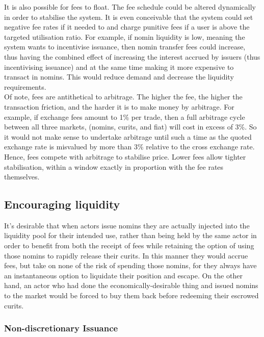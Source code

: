\noindent It is also possible for fees to float. The fee schedule could be altered dynamically in order to stabilise the system. It is even conceivable that the system could set negative fee rates if it needed to and charge punitive fees if a user is above the targeted utilisation ratio. For example, if nomin liquidity is low, meaning the system wants to incentivise issuance, then nomin transfer fees could increase, thus having the combined effect of increasing the interest accrued by issuers (thus incentivising issuance) and at the same time making it more expensive to transact in nomins. This would reduce demand and decrease the liquidity requirements. \\

\noindent Of note, fees are antithetical to arbitrage. The higher the fee, the higher the transaction friction, and the harder it is to make money by arbitrage. For example, if exchange fees amount to 1\% per trade, then a full arbitrage cycle between all three markets, (nomins, curits, and fiat) will cost in excess of 3\%. So it would not make sense to undertake arbitrage until such a time as the quoted exchange rate is misvalued by more than 3\% relative to the cross exchange rate. Hence, fees compete with arbitrage to stabilise price. Lower fees allow tighter stabilisation, within a window exactly in proportion with the fee rates themselves.

\subsection{Encouraging liquidity}

\noindent It's desirable that when actors issue nomins they are actually injected into the liquidity pool for their intended use,
rather than being held by the same actor in order to benefit from both the receipt of fees while retaining the option of using those nomins to rapidly release their curits.
In this manner they would accrue fees, but take on none of the risk of spending those nomins, for they always have an instantaneous option to liquidate their position and escape.
On the other hand, an actor who had done the economically-desirable thing and issued nomins to the market would be forced to buy them back before redeeming their escrowed curits.

\subsubsection{Non-discretionary Issuance}

